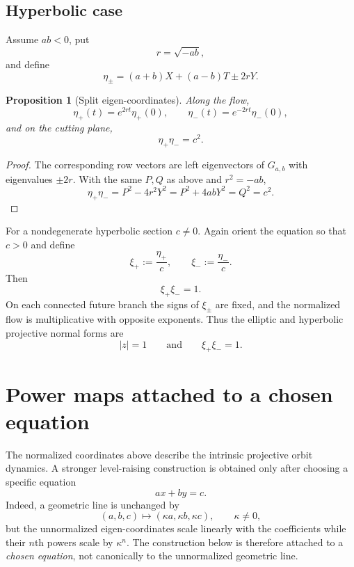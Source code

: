\documentclass[11pt]{amsart}
\newtheorem{proposition}[theorem]{Proposition}
\theoremstyle{remark}
\begin{document}
\subsection{Hyperbolic case}
Assume $ab<0$, put
\[
r=\sqrt{-ab},
\]
and define
\begin{equation}\label{eq:etas}
\eta_\pm=(a+b)X+(a-b)T\pm2rY.
\end{equation}

\begin{proposition}[Split eigen-coordinates]\label{prop:eta}
Along the flow,
\[
\eta_+(t)=e^{2rt}\eta_+(0),
\qquad
\eta_-(t)=e^{-2rt}\eta_-(0),
\]
and on the cutting plane,
\begin{equation}\label{eq:etaproduct}
\boxed{\eta_+\eta_-=c^2.}
\end{equation}
\end{proposition}

\begin{proof}
The corresponding row vectors are left eigenvectors of $G_{a,b}$ with eigenvalues $\pm2r$.  With the same $P,Q$ as above and $r^2=-ab$,
\[
\eta_+\eta_-=P^2-4r^2Y^2
=P^2+4abY^2
=Q^2=c^2.
\]
\end{proof}

For a nondegenerate hyperbolic section $c\ne0$.  Again orient the equation so that $c>0$ and define
\begin{equation}\label{eq:xiprojective}
\boxed{
\xi_+:=\frac{\eta_+}{c},
\qquad
\xi_-:=\frac{\eta_-}{c}.
}
\end{equation}
Then
\begin{equation}\label{eq:xiproduct}
\boxed{\xi_+\xi_-=1.}
\end{equation}
On each connected future branch the signs of $\xi_\pm$ are fixed, and the normalized flow is multiplicative with opposite exponents.  Thus the elliptic and hyperbolic projective normal forms are
\[
|z|=1
\qquad\text{and}\qquad
\xi_+\xi_-=1.
\]

\section{Power maps attached to a chosen equation}

The normalized coordinates above describe the intrinsic projective orbit dynamics.  A stronger level-raising construction is obtained only after choosing a specific equation
\[
ax+by=c.
\]
Indeed, a geometric line is unchanged by
\[
(a,b,c)\mapsto(\kappa a,\kappa b,\kappa c),
\qquad \kappa\ne0,
\]
but the unnormalized eigen-coordinates scale linearly with the coefficients while their $n$th powers scale by $\kappa^n$.  The construction below is therefore attached to a \emph{chosen equation}, not canonically to the unnormalized geometric line.
\end{document}
